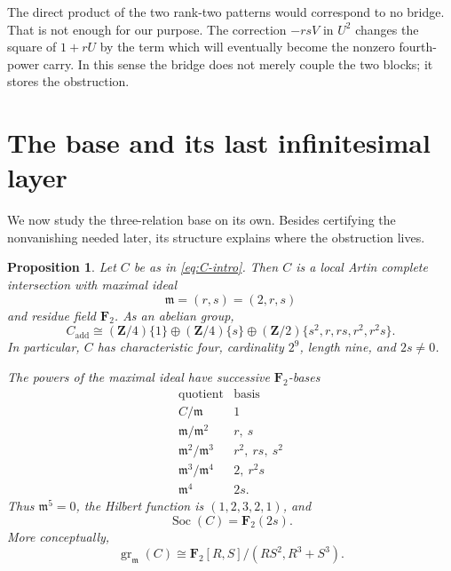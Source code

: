 \documentclass[11pt]{amsart}
\newtheorem{proposition}[theorem]{Proposition}
\theoremstyle{definition}
\theoremstyle{remark}
\newcommand{\Z}{\mathbf Z}
\newcommand{\F}{\mathbf F}
\newcommand{\Soc}{\operatorname{Soc}}
\newcommand{\gr}{\operatorname{gr}}
\newcommand{\m}{\mathfrak m}
\begin{document}
The direct product of the two rank-two patterns would correspond to no
bridge.  That is not enough for our purpose.  The correction \(-rsV\) in
\(U^2\) changes the square of \(1+rU\) by the term which will eventually
become the nonzero fourth-power carry.  In this sense the bridge does not
merely couple the two blocks; it stores the obstruction.

\section{The base and its last infinitesimal layer}\label{sec:base}

We now study the three-relation base on its own.  Besides certifying the
nonvanishing needed later, its structure explains where the obstruction
lives.

\begin{proposition}\label{prop:base}
Let \(C\) be as in \eqref{eq:C-intro}.  Then \(C\) is a local Artin
complete intersection with maximal ideal
\[
 \m=(r,s)=(2,r,s)
\]
and residue field \(\F_2\).  As an abelian group,
\begin{equation}\label{eq:additive-C}
 C_{\mathrm{add}}
 \cong (\Z/4)\{1\}\oplus(\Z/4)\{s\}
 \oplus(\Z/2)\{s^2,r,rs,r^2,r^2s\}.
\end{equation}
In particular, \(C\) has characteristic four, cardinality \(2^9\), length
nine, and \(2s\ne0\).

The powers of the maximal ideal have successive \(\F_2\)-bases
\begin{equation}\label{eq:loewy-bases}
\begin{array}{c|c}
 \text{quotient}&\text{basis}\\ \hline
 C/\m&1\\
 \m/\m^2&r,\ s\\
 \m^2/\m^3&r^2,\ rs,\ s^2\\
 \m^3/\m^4&2,\ r^2s\\
 \m^4&2s.
\end{array}
\end{equation}
Thus \(\m^5=0\), the Hilbert function is \((1,2,3,2,1)\), and
\begin{equation}\label{eq:socle-C}
 \Soc(C)=\F_2(2s).
\end{equation}
More conceptually,
\begin{equation}\label{eq:gr-C}
 \gr_{\m}(C)
 \cong \F_2[R,S]/(RS^2,R^3+S^3).
\end{equation}
\end{proposition}
\end{document}
